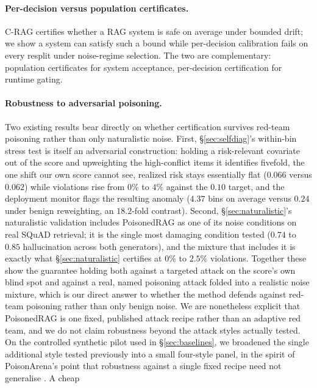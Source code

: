 \documentclass[sn-basic]{sn-jnl}
\theoremstyle{thmstyleone}
\theoremstyle{thmstyletwo}
\begin{document}
\paragraph{Per-decision versus population certificates.}
C-RAG \citep{kang2024crag} certifies whether a RAG system is safe on average
under bounded drift; we show a system can satisfy such a bound while
per-decision calibration fails on every resplit under noise-regime selection.
The two are complementary: population certificates for system acceptance,
per-decision certification for runtime gating.

\paragraph{Robustness to adversarial poisoning.}
Two existing results bear directly on whether certification survives
red-team poisoning rather than only naturalistic noise. First,
\S\ref{sec:selfdiag}'s within-bin stress test is itself an adversarial
construction: holding a risk-relevant covariate out of the score and
upweighting the high-conflict items it identifies fivefold, the one
shift our own score cannot see, realized risk stays essentially flat
($0.066$ versus $0.062$) while violations rise from $0\%$ to $4\%$
against the $0.10$ target, and the deployment monitor flags the
resulting anomaly ($4.37$ bins on average versus $0.24$ under benign
reweighting, an $18.2$-fold contrast). Second,
\S\ref{sec:naturalistic}'s naturalistic validation includes PoisonedRAG
\citep{zou2025poisonedrag} as one of its noise conditions on real
SQuAD retrieval; it is the single most damaging condition tested
($0.74$ to $0.85$ hallucination across both generators), and the
mixture that includes it is exactly what \S\ref{sec:naturalistic}
certifies at $0\%$ to $2.5\%$ violations. Together these show the
guarantee holding both against a targeted attack on the score's own
blind spot and against a real, named poisoning attack folded into a
realistic noise mixture, which is our direct answer to whether the
method defends against red-team poisoning rather than only benign
noise. We are nonetheless explicit that PoisonedRAG is one fixed,
published attack recipe rather than an adaptive red team, and we do
not claim robustness beyond the attack styles actually tested. On the
controlled synthetic pilot used in \S\ref{sec:baselines}, we broadened
the single additional style tested previously into a small four-style
panel,
in the spirit of PoisonArena's point that robustness against a single
fixed recipe need not generalise \citep{chen2025poisonarena}. A cheap
\end{document}
